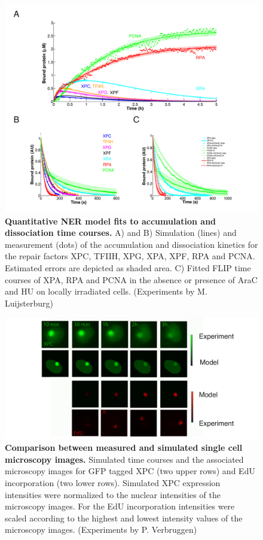 \begin{figure}[htbp]
	\begin{center}
		\includegraphics[width=1\textwidth]{Abbildungen/figure2_6.pdf}
		\caption{\textbf{Quantitative NER model fits to accumulation and dissociation time courses.} A) and B) Simulation (lines) and measurement (dots) of the accumulation and dissociation kinetics for the repair factors XPC, TFIIH, XPG, XPA, XPF, RPA and PCNA. Estimated errors are depicted as shaded area. C) Fitted FLIP time courses of XPA, RPA and PCNA in the absence or presence of AraC and HU on locally irradiated cells. (Experiments by M. Luijsterburg)}
		\label{fig:ModelFit_accu_flip}
	\end{center}
\end{figure}
\begin{figure}[t!]
\begin{center}
\includegraphics[width=1\textwidth]{Abbildungen/figure2_6_2.pdf}
\caption{\textbf{Comparison between measured and simulated single cell microscopy images.} Simulated time courses and the associated microscopy images for GFP tagged XPC (two upper rows) and EdU incorporation (two lower rows). Simulated XPC expression intensities were normalized to the nuclear intensities of the microscopy images. For the EdU incorporation intensities were scaled according to the highest and lowest intensity values of the microscopy images. (Experiments by P. Verbruggen)}
\label{fig:Fitt_accu_Mic}
\end{center}
\end{figure}

